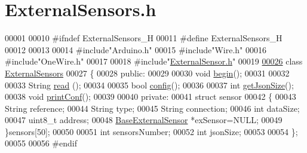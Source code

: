 \hypertarget{_external_sensors_8h_source}{}\section{External\+Sensors.\+h}

\begin{DoxyCode}
00001 
00010 \textcolor{preprocessor}{#ifndef ExternalSensors\_H}
00011 \textcolor{preprocessor}{#define ExternalSensors\_H}
00012 
00013 
00014 \textcolor{preprocessor}{#include"Arduino.h"}  
00015 \textcolor{preprocessor}{#include"Wire.h"}
00016 \textcolor{preprocessor}{#include"OneWire.h"}
00017 
00018 \textcolor{preprocessor}{#include"\hyperlink{_external_sensor_8h}{ExternalSensor.h}"}
00019 
\hyperlink{class_external_sensors}{00026} \textcolor{keyword}{class }\hyperlink{class_external_sensors}{ExternalSensors} 
00027 \{
00028 \textcolor{keyword}{public}:
00029 
00030     \textcolor{keywordtype}{void} \hyperlink{class_external_sensors_a58ede0d786a86417254708870f04a21e}{begin}(); 
00031 
00032 
00033     String \hyperlink{class_external_sensors_a53177b81eca3be89508b5511ddcd00fc}{read} ();
00034 
00035     \textcolor{keywordtype}{bool} \hyperlink{class_external_sensors_a862a4bd11346b37270d0244c2adabe5a}{config}();
00036 
00037     \textcolor{keywordtype}{int} \hyperlink{class_external_sensors_a8e3a93efa8f5a0477f300e26084b6625}{getJsonSize}();
00038     \textcolor{keywordtype}{void} \hyperlink{class_external_sensors_a78c2bf55084435dd51d3c559b2d3c6f3}{printConf}();
00039 
00040 \textcolor{keyword}{private}:
00041     \textcolor{keyword}{struct }sensor
00042     \{       
00043         String reference;
00044         String type;
00045         String connection;
00046         \textcolor{keywordtype}{int} dataSize;
00047         uint8\_t address;    
00048         \hyperlink{class_base_external_sensor}{BaseExternalSensor} *exSensor=NULL;
00049     \}sensors[50];
00050 
00051 \textcolor{keywordtype}{int} sensorsNumber;
00052 \textcolor{keywordtype}{int} jsonSize;
00053 
00054 \};
00055 
00056 \textcolor{preprocessor}{#endif}
\end{DoxyCode}
